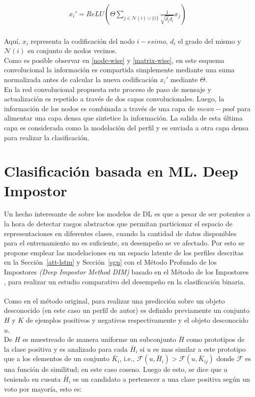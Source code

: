 	 \begin{align}\label{node-wise}
	 	x_i' = ReLU\left( \Theta \sum_{j \in \mathcal{N}(i) \cup \{i\}} \frac{1}{ 	\sqrt{ \hat{d_j} \hat{d_i} } }x_j \right)
	 \end{align}
	 \\
	 Aquí, $x_i$ representa la codificación del nodo $i-esimo$, $d_i$ el grado del mismo y $\mathcal{N}(i)$ su conjunto de nodos vecinos.
	 \\ 
	 Como es posible observar en \ref{node-wise} y \ref{matrix-wise}, en este esquema convolucional la información es compartida simplemente mediante una suma normalizada antes de calcular la nueva codificación $x_i'$ mediante $\Theta$.
	 \\
	 En la red convolucional propuesta este proceso de paso de mensaje y actualización es repetido a través de dos capas convolucionales. Luego, la información de los nodos es combinada a través de una capa de $mean-pool$ para alimentar una capa densa que sintetice la información. La salida de esta última capa es considerada como la modelación del perfil y es enviada a otra capa densa para realizar la clasificación.
	 
	 \section{Clasificación basada en ML. Deep Impostor }
	 
	 Un hecho interesante de sobre los modelos de DL es que a pesar de ser potentes a la hora de detectar rasgos abstractos que permitan particionar el espacio de representaciones en diferentes clases, cuando la cantidad de datos disponibles para el entrenamiento no es suficiente, su desempeño se ve afectado. Por esto se propone emplear las modelaciones  en un espacio latente de los perfiles descritas en la Sección~\ref{att-lstm} y Sección~\ref{sgn} con el Método Profundo de los Impostores \textit{(Deep Impostor Method DIM)} basado en el Método de los Impostores \citep{seidman2013authorship}, para realizar un estudio comparativo del desempeño en la clasificación binaria.
	 \\\\
	 Como en el método original, para realizar una predicción sobre un objeto desconocido (en este caso un perfil de autor) es definido previamente un conjunto $H$ y $K$ de ejemplos positivos y negativos respectivamente y el objeto desconocido $u$.
	 \\
	 De $H$ es muestreado de manera uniforme un subconjunto $\bar{H}$ como prototipos de la clase positiva y es analizado para cada $\bar{H}_i$ si $u$ es mas similar a este prototipo que a los elementos de un conjunto $\bar{K}_i$, i.e., $\mathcal{F}(u, \bar{H}_i) > \mathcal{F}(u, \bar{K}_{ij})$ donde $\mathcal{F}$ es una función de similitud; en este caso coseno. Luego de esto, se dice que $u$ teniendo en cuenta $\bar{H}_i$ es un candidato a pertenecer a una clase positiva según un voto por mayoría, esto es:
	 
